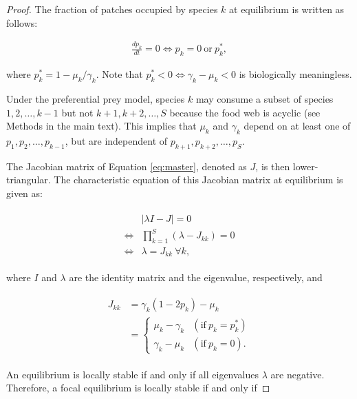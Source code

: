 \documentclass[11pt, class=article, crop=false]{standalone}
\theoremstyle{definition}
\begin{document}
\begin{proof}
The fraction of patches occupied by species $k$ at equilibrium is written as follows:

\begin{align}
    \frac{dp_k}{dt} = 0 \Leftrightarrow p_k = 
         0 ~\text{or}~
         p_{k}^{*},
\end{align}

where $p_{k}^{*} = 1 - \mu_k / \gamma_k$.
Note that $p_{k}^{*} <0 \Leftrightarrow \gamma_k-\mu_k<0$ is biologically meaningless.

Under the preferential prey model, species $k$ may consume a subset of species $1,2,\ldots, k-1$ but not $k+1, k+2, \ldots, S$ because the food web is acyclic (see Methods in the main text).
This implies that $\mu_k$ and $\gamma_k$ depend on at least one of $p_1, p_2, \ldots, p_{k-1}$, but are independent of $p_{k+1}, p_{k+2}, \ldots, p_{S}$.

The Jacobian matrix of Equation \ref{eq:master}, denoted as $J$, is then lower-triangular.
The characteristic equation of this Jacobian matrix at equilibrium is given as:

\begin{align}
    \begin{split}
        &|\lambda I - J| = 0\\
        \Leftrightarrow 
        &\prod_{k=1}^{S}(\lambda -J_{kk})=0\\
        \Leftrightarrow
        &\lambda = J_{kk}~ \forall k,
    \end{split}
\end{align}

where $I$ and $\lambda$ are the identity matrix and the eigenvalue, respectively, and 

\begin{align}
    \begin{split}
        J_{kk}  &= \gamma_k(1-2p_k)-\mu_k \\
                &=\left\{
                       \begin{array}{cl}
                       \mu_k - \gamma_k& (\text{if}~ p_k=p_k^*)\\
                       \gamma_k - \mu_k& (\text{if}~ p_k=0).
                       \end{array}
                   \right.
    \end{split}
\end{align}

An equilibrium is locally stable if and only if all eigenvalues $\lambda$ are negative. Therefore, a focal equilibrium is locally stable if and only if


\end{proof}
\end{document}
